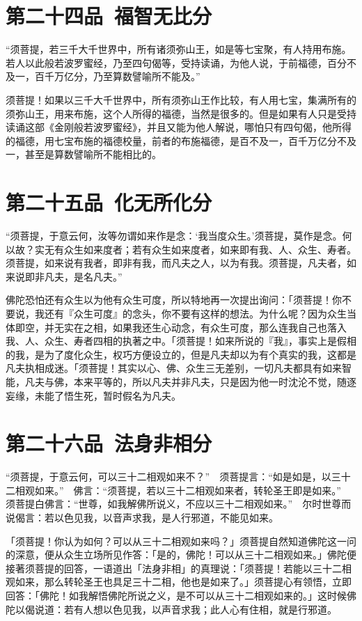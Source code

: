 \documentclass[12pt,twoside,openany]{book}
\newcommand{\kai}[1]{{\CJKfamily{kai}#1}}
\begin{document}
\chapter{第二十四品\ 福智无比分}
“须菩提，若三千大千世界中，所有诸须弥山王，如是等七宝聚，有人持用布施。若人以此般若波罗蜜经，乃至四句偈等，受持读诵，为他人说，于前福德，百分不及一，百千万亿分，乃至算数譬喻所不能及。”

\kai{须菩提！如果以三千大千世界中，所有须弥山王作比较，有人用七宝，集满所有的须弥山王，用来布施，这个人所得的福德，当然是很多的。但是如果有人只是受持读诵这部《金刚般若波罗蜜经》，并且又能为他人解说，哪怕只有四句偈，他所得的福德，用七宝布施的福德校量，前者的布施福德，是百不及一，百千万亿分不及一，甚至是算数譬喻所不能相比的。}

\chapter{第二十五品\ 化无所化分}
“须菩提，于意云何，汝等勿谓如来作是念：‘我当度众生。’须菩提，莫作是念。何以故？实无有众生如来度者；若有众生如来度者，如来即有我、人、众生、寿者。须菩提，如来说有我者，即非有我，而凡夫之人，以为有我。须菩提，凡夫者，如来说即非凡夫，是名凡夫。”

\kai{佛陀恐怕还有众生以为他有众生可度，所以特地再一次提出询问：「须菩提！你不要说，我还有『众生可度』的念头，你不要有这样的想法。为什么呢？因为众生当体即空，并无实在之相，如果我还生心动念，有众生可度，那么连我自己也落入我、人、众生、寿者四相的执著之中。「须菩提！如来所说的『我』，事实上是假相的我，是为了度化众生，权巧方便设立的，但是凡夫却以为有个真实的我，这都是凡夫执相成迷。「须菩提！其实以心、佛、众生三无差别，一切凡夫都具有如来智能，凡夫与佛，本来平等的，所以凡夫并非凡夫，只是因为他一时沈沦不觉，随逐妄缘，未能了悟生死，暂时假名为凡夫。}

\chapter{第二十六品\ 法身非相分}
“须菩提，于意云何，可以三十二相观如来不？”　须菩提言：“如是如是，以三十二相观如来。”　佛言：“须菩提，若以三十二相观如来者，转轮圣王即是如来。”　须菩提白佛言：“世尊，如我解佛所说义，不应以三十二相观如来。”　尔时世尊而说偈言：若以色见我，以音声求我，是人行邪道，不能见如来。

\kai{「须菩提！你认为如何？可以从三十二相观如来吗？」须菩提自然知道佛陀这一问的深意，便从众生立场所见作答：「是的，佛陀！可以从三十二相观如来。」佛陀便接著须菩提的回答，一语道出「法身非相」的真理说：「须菩提！若能以三十二相观如来，那么转轮圣王也具足三十二相，他也是如来了。」须菩提心有领悟，立即回答：「佛陀！如我解悟佛陀所说之义，是不可以从三十二相观如来的。」这时候佛陀以偈说道：若有人想以色见我，以声音求我；此人心有住相，就是行邪道。}
\end{document}
